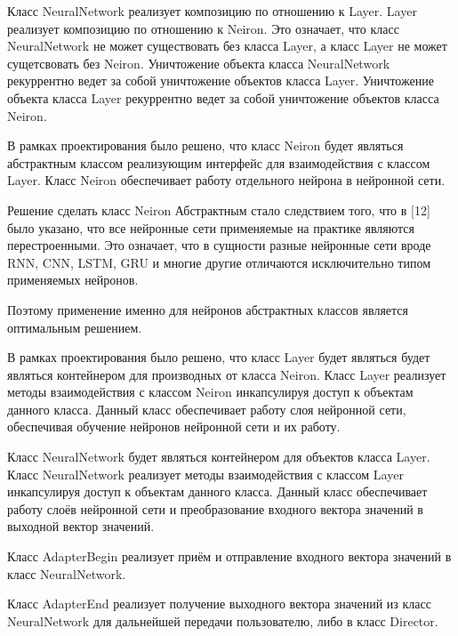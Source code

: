 {\par \redline  Класс NeuralNetwork реализует композицию по отношению к Layer. Layer реализует композицию по отношению к Neiron. Это означает, что класс NeuralNetwork не может существовать без класса Layer, а класс Layer не может сущетсвовать без Neiron. Уничтожение объекта класса NeuralNetwork рекуррентно ведет за собой уничтожение объектов класса Layer.  Уничтожение объекта класса Layer рекуррентно ведет за собой уничтожение объектов класса Neiron.

\par \redline  В рамках проектирования было решено, что класс Neiron будет являться абстрактным классом реализующим интерфейс для взаимодействия с классом Layer. Класс Neiron обеспечивает работу отдельного нейрона в нейронной сети.



\par \redline  Решение сделать класс Neiron Абстрактным стало следствием того, что в [12] было указано, что все нейронные сети применяемые на практике являются перестроенными. Это означает, что в сущности разные нейронные сети вроде RNN, CNN, LSTM, GRU и многие другие отличаются исключительно типом применяемых нейронов.

\par \redline Поэтому применение именно для нейронов абстрактных классов является оптимальным решением.  

\par \redline В рамках проектирования было решено, что класс Layer будет являться будет являться контейнером для производных от класса Neiron. Класс Layer реализует методы взаимодействия с классом Neiron инкапсулируя доступ к объектам данного класса. Данный класс обеспечивает работу слоя нейронной сети, обеспечивая обучение нейронов нейронной сети и их работу. 

\par \redline Класс NeuralNetwork будет являться контейнером для объектов класса Layer. Класс NeuralNetwork реализует методы взаимодействия с классом Layer инкапсулируя доступ к объектам данного класса. Данный класс обеспечивает работу слоёв нейронной сети и преобразование входного вектора значений в выходной вектор значений. 

\par \redline Класс AdapterBegin реализует приём и отправление входного вектора значений в класс NeuralNetwork.  

\par \redline  Класс AdapterEnd реализует получение выходного вектора значений из класс NeuralNetwork для дальнейшей передачи пользователю, либо в класс Director.

}
